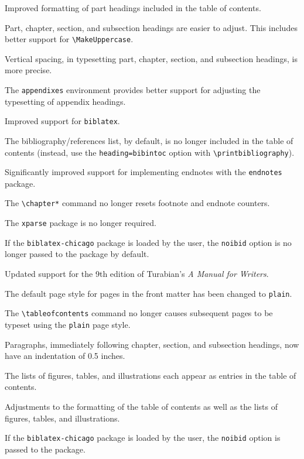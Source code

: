 \documentclass{article}
\newcommand{\textcmd}[1]{\texttt{\textbackslash #1}}
\begin{document}
Improved formatting of part headings included in the table of contents.

%

Part, chapter, section, and subsection headings are easier to adjust. This includes better support for \textcmd{MakeUppercase}.

Vertical spacing, in typesetting part, chapter, section, and subsection headings, is more precise.

The \texttt{appendixes} environment provides better support for adjusting the typesetting of appendix headings.

Improved support for \texttt{biblatex}.

The bibliography/references list, by default, is no longer included in the table of contents (instead, use the \texttt{heading=bibintoc} option with \textcmd{printbibliography}).

Significantly improved support for implementing endnotes with the \texttt{endnotes} package.

The \textcmd{chapter*} command no longer resets footnote and endnote counters.

The \texttt{xparse} package is no longer required.

%

If the \texttt{biblatex-chicago} package is loaded by the user, the \texttt{noibid} option is no longer passed to the package by default.

%

Updated support for the 9th edition of Turabian's \emph{A Manual for Writers}.

The default page style for pages in the front matter has been changed to \texttt{plain}.

The \textcmd{tableofcontents} command no longer causes subsequent pages to be typeset using the \texttt{plain} page style.

Paragraphs, immediately following chapter, section, and subsection headings, now have an indentation of 0.5 inches.

The lists of figures, tables, and illustrations each appear as entries in the table of contents.

Adjustments to the formatting of the table of contents as well as the lists of figures, tables, and illustrations.

If the \texttt{biblatex-chicago} package is loaded by the user, the \texttt{noibid} option is passed to the package.
\end{document}
